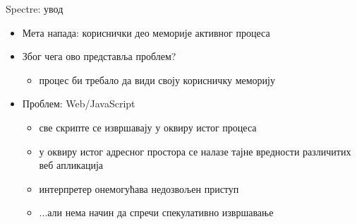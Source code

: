 \documentclass[xcolor=table]{beamer}
\begin{document}
    \begin{frame}{Spectre: увод}
        \begin{itemize}
            \item Мета напада: кориснички део меморије активног процеса
            \item Због чега ово представља проблем?
            \begin{itemize}
                \item процес би требало да види своју корисничку меморију
            \end{itemize}
            \item Проблем: Web/JavaScript
            \begin{itemize}
                \item све скрипте се извршавају у оквиру истог процеса
                \item у оквиру истог адресног простора се налазе тајне вредности различитих веб апликација
                \item интерпретер онемогућава недозвољен приступ
                \item ...али нема начин да спречи спекулативно извршавање
            \end{itemize}
        \end{itemize}
    \end{frame}
        
\end{document}

